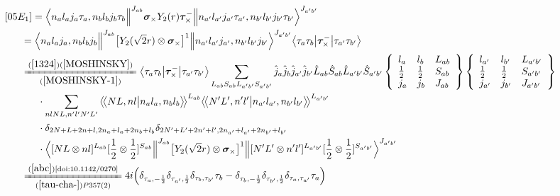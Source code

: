\documentclass[master]{shnuthesis}
\newcommand{\llangle}{\big\langle\!\big\langle}
\newcommand{\rrangle}{\big\rangle\!\big\rangle}
\newcommand{\ap}{a^\prime}
\newcommand{\bp}{b^\prime}
\newcommand{\il}{\!\!\!\!\!\!\!\!\!\!}
\newcommand{\ii}{\!\!\!\!\!\!\!\!\!\!\!\!\!\!\!\!\!\!\!\!}
\newcommand{\zdydh}{\xlongequal}
\begin{document}
\begin{align}
    &\ii [05E_1] = \Big\langle n_a l_a j_a \tau_a, n_b l_b j_b \tau_b \Big\|^{J_{ab}} \bm{\sigma}_\times Y_2(r) \bm{\tau}_\times^- \Big\| n_{\ap} l_{\ap} j_{\ap} \tau_{\ap}, n_{\bp} l_{\bp} j_{\bp} \tau_{\bp} \Big\rangle^{J_{\ap \bp}} \\
    &\il = \Big\langle n_a l_a j_a, n_b l_b j_b \Big\|^{J_{ab}} \big[Y_2(\sqrt{2}r) \otimes \bm{\sigma}_\times\big]^1 \Big\| n_{\ap} l_{\ap} j_{\ap}, n_{\bp} l_{\bp} j_{\bp} \Big\rangle^{J_{\ap \bp}} \big\langle \tau_a\tau_b \big|\bm{\tau}_\times^- \big|\tau_{\ap}\tau_{\bp}\big\rangle \\
    &\il \zdydh[(\ref{MOSHINSKY-1})]{(\ref{1324})(\ref{MOSHINSKY})} \big\langle \tau_a\tau_b \big|\bm{\tau}_\times^- \big|\tau_{\ap}\tau_{\bp}\big\rangle \sum_{L_{ab}S_{ab}L_{\ap\bp}S_{\ap\bp}} \hat{j}_a\hat{j}_b\hat{j}_{\ap}\hat{j}_{\bp}\hat{L}_{ab}\hat{S}_{ab}\hat{L}_{\ap\bp}\hat{S}_{\ap\bp}  \left\{\begin{array}{lll}l_{a} & l_{b} & L_{ab} \\ \frac{1}{2} & \frac{1}{2} & S_{ab} \\j_{a} & j_{b} & J_{ab} \end{array}\right\} \left\{\begin{array}{lll}l_{\ap} & l_{\bp} & L_{\ap\bp} \\ \frac{1}{2} & \frac{1}{2} & S_{\ap\bp} \\j_{\ap} & j_{\bp} & J_{\ap\bp} \end{array}\right\}  \notag \\
    & \cdot \sum_{nlNL,n^\prime l^\prime N^\prime L^\prime} \llangle N L, n l \big| n_{a} l_{a}, n_{b} l_{b} \rrangle^{L_{ab}} \llangle N^\prime L^\prime, n^\prime l^\prime \big| n_{a^\prime} l_{a^\prime}, n_{b^\prime} l_{b^\prime} \rrangle^{L_{\ap\bp}} \notag\\
    & \cdot \delta_{2N+L+2n+l,2n_a+l_a+2n_b+l_b}\delta_{2N^\prime+L^\prime+2n^\prime+l^\prime,2n_{a^\prime}+l_{a^\prime}+2n_{b^\prime}+l_{b^\prime}}  \notag\\
    & \cdot \Big\langle [N L \otimes n l]^{L_{ab}} [\frac{1}{2}\otimes\frac{1}{2}]^{S_{ab}} \Big\|^{J_{ab}} \big[Y_2(\sqrt{2}r) \otimes \bm{\sigma}_\times\big]^1 \Big\| [N^\prime L^\prime \otimes n^\prime l^\prime]^{L_{\ap\bp}} [\frac{1}{2}\otimes\frac{1}{2}]^{S_{\ap\bp}} \Big\rangle^{J_{\ap \bp}} \\
    &\il \zdydh[(\ref{tau-cha-})P357(2)]{(\ref{abc})\text{\cite{doi:10.1142/0270}}} 4i \Big( \delta_{\tau_a,-\frac{1}{2}}\delta_{\tau_{\ap},\frac{1}{2}}\delta_{\tau_b,\tau_{\bp}}\tau_b - \delta_{\tau_b,-\frac{1}{2}}\delta_{\tau_{\bp},\frac{1}{2}}\delta_{\tau_a,\tau_{\ap}}\tau_a \Big) \notag\\

\end{align}
\end{document}
